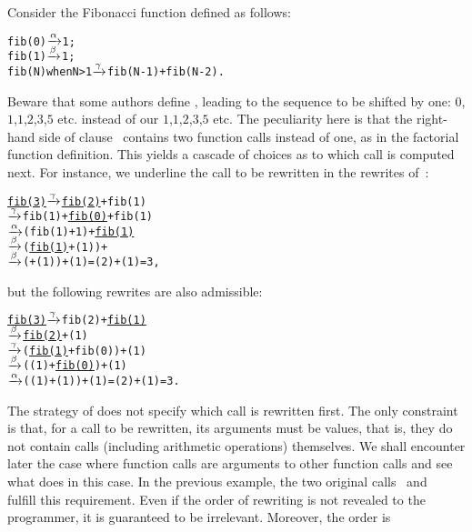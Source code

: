 Consider the Fibonacci function defined as follows:
\begin{alltt}
fib(0)            \(\xrightarrow{\smash[t]{\alpha}}\) 1;
fib(1)            \(\xrightarrow{\smash[t]{\beta}}\) 1;
fib(N) when N > 1 \(\xrightarrow{\smash[t]{\gamma}}\) fib(N-1) + fib(N-2).
\end{alltt}
Beware that some authors define , leading to the
sequence to be shifted by one: \(0\),\(1\),\(1\),\(2\),\(3\),\(5\)
etc. instead of our \(1\),\(1\),\(2\),\(3\),\(5\) etc. The peculiarity
here is that the right\hyp{}hand side of clause~\clause{\gamma}
contains two function calls instead of one, as in the factorial
function definition. This yields a cascade of choices as to which call
is computed next. For instance, we underline the call to be rewritten
in the rewrites of~:
\begin{alltt}
\underline{fib(3)} \(\xrightarrow{\smash[t]{\gamma}}\)            \underline{fib(2)} + fib(1)
       \(\xrightarrow{\smash[t]{\gamma}}\) \obp{}fib(1) + \underline{fib(0)}\cbp{} + fib(1)
       \(\xrightarrow{\smash[t]{\alpha}}\) (fib(1) +    \obp{}1\cbp) + \underline{fib(1)}
       \(\xrightarrow{\smash[t]{\beta}}\) (\underline{fib(1)} +    (1)) +    \cbp
       \(\xrightarrow{\smash[t]{\beta}}\) (   \cbp +    (1)) +    (1) = (2) + (1) = 3\textrm{,}
\end{alltt}
but the following rewrites are also admissible:
\begin{alltt}
\underline{fib(3)} \(\xrightarrow{\smash[t]{\gamma}}\)            fib(2) + \underline{fib(1)}
       \(\xrightarrow{\smash[t]{\beta}}\)            \underline{fib(2)} +    (1)
       \(\xrightarrow{\smash[t]{\gamma}}\) (\underline{fib(1)} + fib(0)) +    (1)
       \(\xrightarrow{\smash[t]{\beta}}\) (   (1) + \underline{fib(0)}) +    (1)
       \(\xrightarrow{\smash[t]{\alpha}}\) (   (1) +    (1)) +    (1) = (2) + (1) = 3\textrm{.}
\end{alltt}
The strategy of \Erlang does not specify which call is rewritten
first. The only constraint is that, for a call to be rewritten, its
arguments must be values, that is, they do not contain calls
(including arithmetic operations) themselves. We shall encounter later
the case where function calls are arguments to other function calls
and see what \Erlang does in this case. In the previous example, the
two original calls~ and~ fulfill this
requirement. Even if the order of rewriting is not revealed to the
programmer, it is guaranteed to be irrelevant. Moreover, the order is
